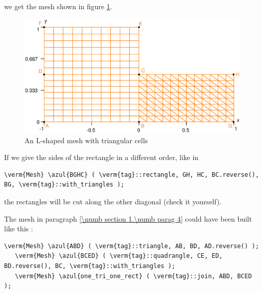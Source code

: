 \noindent we get the mesh shown in figure \ref{\numb section 2.\numb fig 3}.

\begin{figure}[ht] \centering
  \includegraphics[width=115mm]{L-shaped-tri}
  \caption{An L-shaped mesh with triangular cells}
  \label{\numb section 2.\numb fig 3}
\end{figure}

If we give the sides of the rectangle in a different order, like in

\begin{Verbatim}[commandchars=\\\{\},formatcom=\small\tt,baselinestretch=0.94]
   \verm{Mesh} \azul{BGHC} ( \verm{tag}::rectangle, GH, HC, BC.reverse(), BG, \verm{tag}::with_triangles );
\end{Verbatim}

\noindent the rectangles will be cut along the other diagonal (check it yourself).

The mesh in paragraph \ref{\numb section 1.\numb parag 4} could have been built like this :

\begin{Verbatim}[commandchars=\\\{\},formatcom=\small\tt,baselinestretch=0.94]
   \verm{Mesh} \azul{ABD} ( \verm{tag}::triangle, AB, BD, AD.reverse() );
   \verm{Mesh} \azul{BCED} ( \verm{tag}::quadrangle, CE, ED, BD.reverse(), BC, \verm{tag}::with_triangles );
   \verm{Mesh} \azul{one_tri_one_rect} ( \verm{tag}::join, ABD, BCED );
\end{Verbatim}


